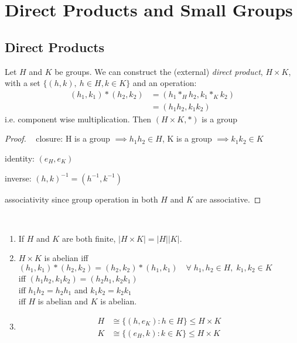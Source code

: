 \section{Direct Products and Small Groups}

\subsection{Direct Products}

\begin{definition}
  Let $H$ and $K$ be groups. We can construct the (external) \emph{direct product}, $H \times K$, with a set $\{ (h, k),\ h \in H, k \in K \}$ and an operation:
  \begin{align*}
    (h_1, k_1) * (h_2, k_2) &= (h_1 *_H h_2, k_1 *_K k_2) \\
    &= (h_1 h_2, k_1 k_2)
  \end{align*} i.e. component wise multiplication. 
  Then $(H \times K, *)$ is a group
\end{definition}

\begin{proof} ~
closure: H is a group $\implies h_1 h_2 \in H$, K is a group $\implies k_1 k_2 \in K$

identity: $(e_H, e_K)$

inverse: $(h, k)^{-1} = (h^{-1}, k^{-1})$

associativity since group operation in both $H$ and $K$ are associative.
\end{proof} 

\begin{remark} ~
  \begin{enumerate}
    \item If $H$ and $K$ are both finite, $| H \times K| = |H| |K|$.
    \item $H \times K$ is abelian iff $(h_1, k_1) * (h_2, k_2) = (h_2, k_2) * (h_1, k_1) \quad \forall \; h_1, h_2 \in H,\; k_1, k_2 \in K$ \\
    iff $(h_1 h_2, k_1 k_2) = (h_2 h_1, k_2 k_1)$ \\
    iff $h_1 h_2 = h_2 h_1$ and $k_1 k_2 = k_2 k_1$ \\
    iff $H$ is abelian and $K$ is abelian.
    \item \begin{align*}
      H &\cong \{ (h, e_K) : h \in H \} \leq H \times K \\
      K &\cong \{ (e_H, k) : k \in K \} \leq H \times K
    \end{align*}
  \end{enumerate}
\end{remark} 


